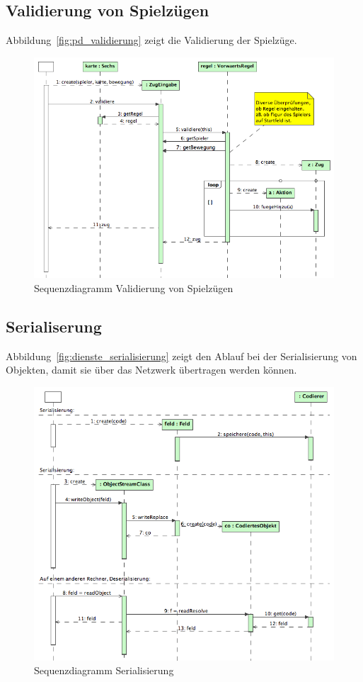 \documentclass[12pt,halfparskip]{scrartcl}
\begin{document}
\clearpage
\subsection{Validierung von Spielzügen}
\label{ssub:validierung_von_spielzügen}
Abbildung~\vref{fig:pd_validierung} zeigt die Validierung der Spielzüge.
\begin{figure}[h]
	\centering
	\includegraphics[width=\textwidth]{pd_validierung}
	\caption{Sequenzdiagramm Validierung von Spielzügen}
	\label{fig:pd_validierung}
\end{figure}

\clearpage
\subsection{Serialiserung}
\label{sub:serialiserung}
Abbildung~\vref{fig:dienste_serialisierung} zeigt den Ablauf bei der Serialisierung von Objekten, damit sie über das Netzwerk übertragen werden können.
\begin{figure}[h]
	\centering
	\includegraphics[width=\textwidth]{dienste_serialisierung}
	\caption{Sequenzdiagramm Serialisierung}
	\label{fig:dienste_serialisierung}
\end{figure}
\end{document}
